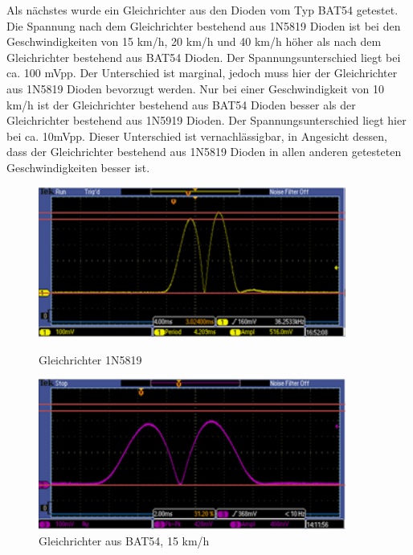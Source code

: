 Als nächstes wurde ein Gleichrichter aus den Dioden vom Typ BAT54 getestet. Die Spannung nach dem Gleichrichter bestehend aus 1N5819 Dioden ist bei den Geschwindigkeiten von 15 km/h, 20 km/h und 40 km/h höher als nach dem Gleichrichter bestehend aus BAT54 Dioden. Der Spannungsunterschied liegt bei ca. 100 mVpp. Der Unterschied ist marginal, jedoch muss hier der Gleichrichter aus 1N5819 Dioden bevorzugt werden. Nur bei einer Geschwindigkeit von 10 km/h ist der Gleichrichter bestehend aus BAT54 Dioden besser als der Gleichrichter bestehend aus 1N5919 Dioden. Der Spannungsunterschied liegt hier bei ca. 10mVpp. Dieser Unterschied ist vernachlässigbar, in Angesicht dessen, dass der Gleichrichter bestehend aus 1N5819 Dioden in allen anderen getesteten Geschwindigkeiten besser ist.

\begin{figure}[ht]
 \begin{minipage}[t]{0.5\textwidth}
    \includegraphics[width=0.9\textwidth]{3Vorgehen/imag/Messung_Optimierung_Gleichrichter_2_links.png}
    \caption{Gleichrichter 1N5819}
    \label{messung_optimierung_gleichrichter_2} 
 \end{minipage}
 \begin{minipage}[t]{0.5\textwidth}
    \includegraphics[width=0.9\textwidth]{3Vorgehen/imag/Messung_Optimierung_Gleichrichter_2_rechts.png}
    \caption{Gleichrichter aus BAT54, 15 km/h}
 \end{minipage}
\end{figure}

